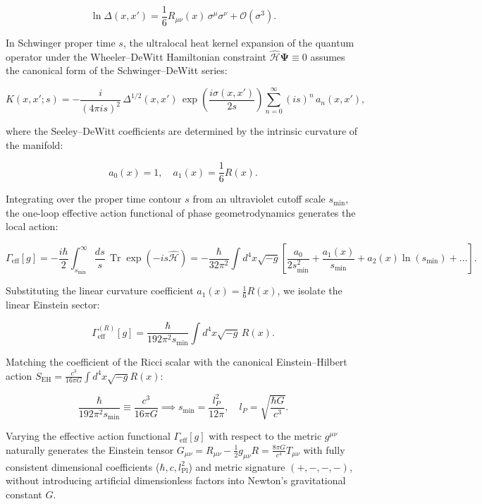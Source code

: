 \begin{equation}\label{eq:1.63b}\tag{1.63b}
\ln \Delta(x, x') = \frac{1}{6} R_{\mu\nu}(x) \, \sigma^\mu \sigma^\nu + \mathcal{O}(\sigma^3).
\end{equation}

In Schwinger proper time $s$, the ultralocal heat kernel expansion of the quantum operator under the Wheeler--DeWitt Hamiltonian constraint $\hat{\mathcal{H}}\mathbf{\Psi} \equiv 0$ assumes the canonical form of the Schwinger--DeWitt series:

\begin{equation}\label{eq:1.63c}\tag{1.63c}
K(x, x'; s) = -\frac{i}{(4\pi i s)^2} \, \Delta^{1/2}(x, x') \, \exp\left( \frac{i \sigma(x, x')}{2s} \right) \sum_{n=0}^\infty (i s)^n \, a_n(x, x'),
\end{equation}

where the Seeley--DeWitt coefficients are determined by the intrinsic curvature of the manifold:

\begin{equation}\label{eq:1.63d}\tag{1.63d}
a_0(x) = 1, \quad a_1(x) = \frac{1}{6} R(x).
\end{equation}

Integrating over the proper time contour $s$ from an ultraviolet cutoff scale $s_{\text{min}}$, the one-loop effective action functional of phase geometrodynamics generates the local action:

\begin{equation}\label{eq:1.63e}\tag{1.63e}
\Gamma_{\text{eff}}[g] = -\frac{i\hbar}{2} \int_{s_{\text{min}}}^\infty \frac{ds}{s} \, \operatorname{Tr} \exp(-i s \hat{\mathcal{H}}) = -\frac{\hbar}{32\pi^2} \int d^4x \sqrt{-g} \left[ \frac{a_0}{2 s_{\text{min}}^2} + \frac{a_1(x)}{s_{\text{min}}} + a_2(x) \ln(s_{\text{min}}) + \dots \right].
\end{equation}

Substituting the linear curvature coefficient $a_1(x) = \frac{1}{6} R(x)$, we isolate the linear Einstein sector:

\begin{equation}\label{eq:1.63f}\tag{1.63f}
\Gamma_{\text{eff}}^{(R)}[g] = \frac{\hbar}{192 \pi^2 s_{\text{min}}} \int d^4x \sqrt{-g} \, R(x).
\end{equation}

Matching the coefficient of the Ricci scalar with the canonical Einstein--Hilbert action $S_{\text{EH}} = \frac{c^3}{16\pi G} \int d^4x \sqrt{-g} R(x)$:

\begin{equation}\label{eq:1.63g}\tag{1.63g}
\frac{\hbar}{192 \pi^2 s_{\text{min}}} \equiv \frac{c^3}{16\pi G} \implies s_{\text{min}} = \frac{l_P^2}{12\pi}, \quad l_P = \sqrt{\frac{\hbar G}{c^3}}.
\end{equation}

Varying the effective action functional $\Gamma_{\text{eff}}[g]$ with respect to the metric $g^{\mu\nu}$ naturally generates the Einstein tensor $G_{\mu\nu} = R_{\mu\nu} - \frac{1}{2}g_{\mu\nu} R = \frac{8\pi G}{c^4} T_{\mu\nu}$ with fully consistent dimensional coefficients ($\hbar, c, l_{\text{Pl}}^2$) and metric signature $(+,-,-,-)$, without introducing artificial dimensionless factors into Newton's gravitational constant $G$.
